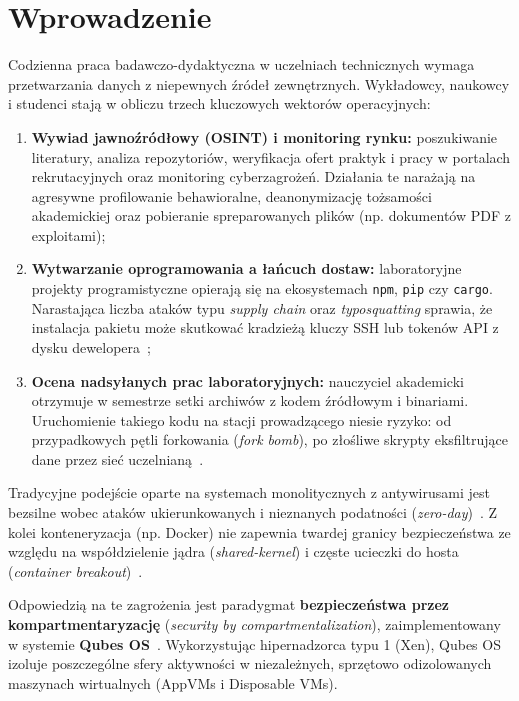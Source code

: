 \section{Wprowadzenie}
\label{sec:wprowadzenie}

Codzienna praca badawczo-dydaktyczna w uczelniach technicznych wymaga przetwarzania danych z niepewnych źródeł zewnętrznych. Wykładowcy, naukowcy i studenci stają w obliczu trzech kluczowych wektorów operacyjnych:
\begin{enumerate}[label=\alph*)]
    \item \textbf{Wywiad jawnoźródłowy (OSINT) i monitoring rynku:} poszukiwanie literatury, analiza repozytoriów, weryfikacja ofert praktyk i pracy w portalach rekrutacyjnych oraz monitoring cyberzagrożeń. Działania te narażają na agresywne profilowanie behawioralne, deanonymizację tożsamości akademickiej oraz pobieranie spreparowanych plików (np. dokumentów PDF z exploitami);
    \item \textbf{Wytwarzanie oprogramowania a łańcuch dostaw:} laboratoryjne projekty programistyczne opierają się na ekosystemach \texttt{npm}, \texttt{pip} czy \texttt{cargo}. Narastająca liczba ataków typu \textit{supply chain} oraz \textit{typosquatting} sprawia, że instalacja pakietu może skutkować kradzieżą kluczy SSH lub tokenów API z dysku dewelopera~\cite{ohm2020backstabber,ladisa2023sok};
    \item \textbf{Ocena nadsyłanych prac laboratoryjnych:} nauczyciel akademicki otrzymuje w semestrze setki archiwów z kodem źródłowym i binariami. Uruchomienie takiego kodu na stacji prowadzącego niesie ryzyko: od przypadkowych pętli forkowania (\textit{fork bomb}), po złośliwe skrypty eksfiltrujące dane przez sieć uczelnianą~\cite{edwards2017grading}.
\end{enumerate}

Tradycyjne podejście oparte na systemach monolitycznych z antywirusami jest bezsilne wobec ataków ukierunkowanych i nieznanych podatności (\textit{zero-day})~\cite{nask_cyberuczelnia2025,enisa_threat_landscape2024}. Z kolei konteneryzacja (np. Docker) nie zapewnia twardej granicy bezpieczeństwa ze względu na współdzielenie jądra (\textit{shared-kernel}) i częste ucieczki do hosta (\textit{container breakout})~\cite{sultan2019containers}. 

Odpowiedzią na te zagrożenia jest paradygmat \textbf{bezpieczeństwa przez kompartmentaryzację} (\textit{security by compartmentalization}), zaimplementowany w systemie \textbf{Qubes OS}~\cite{rutkowska2010qubes}. Wykorzystując hipernadzorca typu 1 (Xen), Qubes OS izoluje poszczególne sfery aktywności w niezależnych, sprzętowo odizolowanych maszynach wirtualnych (AppVMs i Disposable VMs).

